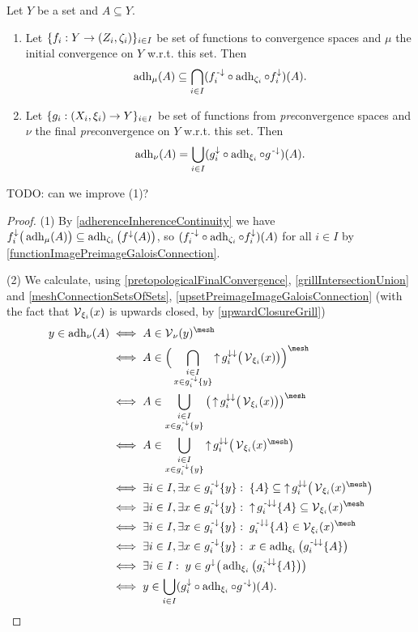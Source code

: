 \begin{proposition} \label{adherenceInitialFinalConvergence}
Let $Y$ be a set and $A\subseteq Y$.
\begin{enumerate}
\item Let $\{f_i: Y\to \left( Z_i, \zeta_i \right)\}_{i\in I}$ be set of functions to convergence spaces and $\mu$ the initial convergence on $Y$ w.r.t. this set. Then
\[ \operatorname{adh}_\mu(A) \subseteq \bigcap_{i\in I}(f^{{\text{\hspace{0.15em}-}\downarrow}}_i\circ \operatorname{adh}_{\zeta_i}\circ f^{\downarrow}_i)(A). \]
\item Let $\{g_i: \left( X_i, \xi_i \right) \to Y\}_{i\in I}$ be set of functions from \emph{pre}convergence spaces and $\nu$ the final \emph{pre}convergence on $Y$ w.r.t. this set. Then
\[ \operatorname{adh}_\nu(A) = \bigcup_{i\in I}(g_i^{\downarrow}\circ\operatorname{adh}_{\xi_i}\circ g^{{\text{\hspace{0.15em}-}\downarrow}})(A). \]
\end{enumerate}
\end{proposition}
TODO: can we improve (1)?
\begin{proof}
(1) By \ref{adherenceInherenceContinuity} we have $f_i^{\downarrow}\big(\operatorname{adh}_\mu(A)\big) \subseteq \operatorname{adh}_{\zeta_i}\big(f^{\downarrow}(A)\big)$, so $(f^{{\text{\hspace{0.15em}-}\downarrow}}_i\circ \operatorname{adh}_{\zeta_i}\circ f^{\downarrow}_i)(A)$ for all $i\in I$ by \ref{functionImagePreimageGaloisConnection}.

(2) We calculate, using \ref{pretopologicalFinalConvergence}, \ref{grillIntersectionUnion} and \ref{meshConnectionSetsOfSets}, \ref{upsetPreimageImageGaloisConnection} (with the fact that $\operatorname{\mathcal{V}}_{\xi_i}(x)$ is upwards closed, by \ref{upwardClosureGrill})
\begin{align*}
y\in \adh_\nu(A) &\iff A\in \vicinity_\nu(y)^\mesh \\
&\iff A\in \Big(\bigcap_{\substack{i\in I \\ x\in g^\preimf_i\{y\}}}\upset g_i^{\imf\imf}\big(\vicinity_{\xi_i}(x)\big)\Big)^\mesh \\
&\iff A\in \bigcup_{\substack{i\in I \\ x\in g^\preimf_i\{y\}}}\big(\upset g_i^{\imf\imf}\big(\vicinity_{\xi_i}(x)\big)\big)^\mesh \\
&\iff A\in \bigcup_{\substack{i\in I \\ x\in g^\preimf_i\{y\}}}\upset g_i^{\imf\imf}\big(\vicinity_{\xi_i}(x)^\mesh\big) \\
&\iff \exists i\in I, \exists x\in g^\preimf_i\{y\}: \;  \{A\}\subseteq \upset g_i^{\imf\imf}\big(\vicinity_{\xi_i}(x)^\mesh\big) \\
&\iff \exists i\in I, \exists x\in g^\preimf_i\{y\}: \;  \upset g_i^{\preimf\imf}\{A\}\subseteq \vicinity_{\xi_i}(x)^\mesh \\
&\iff \exists i\in I, \exists x\in g^\preimf_i\{y\}: \;  g_i^{\preimf\imf}\{A\}\in \vicinity_{\xi_i}(x)^\mesh \\
&\iff \exists i\in I, \exists x\in g^\preimf_i\{y\}: \;  x\in \adh_{\xi_i}\big(g_i^{\preimf\imf}\{A\}\big) \\
&\iff \exists i\in I: \;  y\in g^{\imf}\big(\adh_{\xi_i}\big(g_i^{\preimf\imf}\{A\}\big)\big) \\
&\iff y\in \bigcup_{i\in I}(g_i^{\imf}\circ\adh_{\xi_i}\circ g^{\preimf})(A).
\end{align*}
\end{proof}




